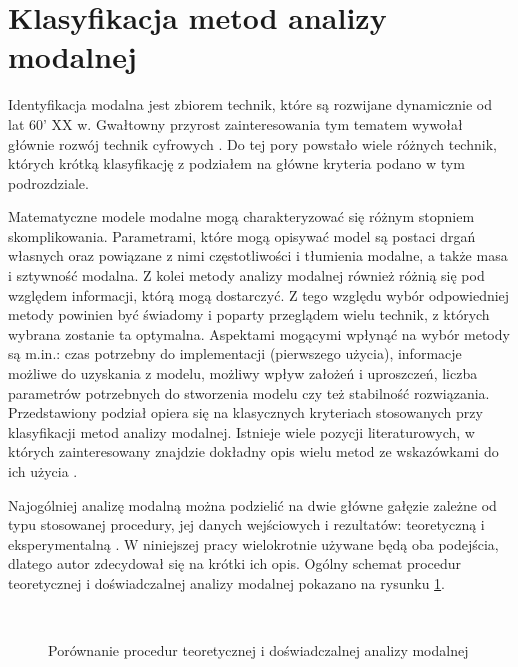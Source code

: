 \section{Klasyfikacja metod analizy modalnej}

Identyfikacja modalna jest zbiorem technik, które są rozwijane dynamicznie od lat 60' XX w. Gwałtowny przyrost zainteresowania tym tematem wywołał głównie rozwój technik cyfrowych \parencite{Ewins2000}. Do tej pory powstało wiele różnych technik, których krótką klasyfikację z podziałem na główne kryteria podano w tym podrozdziale.

Matematyczne modele modalne mogą charakteryzować się różnym stopniem skomplikowania. Parametrami, które mogą opisywać model są postaci drgań własnych oraz powiązane z nimi częstotliwości i tłumienia modalne, a także masa i sztywność modalna. Z kolei metody analizy modalnej również różnią się pod względem informacji, którą mogą dostarczyć. Z tego względu wybór odpowiedniej metody powinien być świadomy i poparty przeglądem wielu technik, z których wybrana zostanie ta optymalna. Aspektami mogącymi wpłynąć na wybór metody są m.in.: czas potrzebny do implementacji (pierwszego użycia), informacje możliwe do uzyskania z modelu, możliwy wpływ założeń i uproszczeń, liczba parametrów potrzebnych do stworzenia modelu czy też stabilność rozwiązania. Przedstawiony podział opiera się na klasycznych kryteriach stosowanych przy klasyfikacji metod analizy modalnej. Istnieje wiele pozycji literaturowych, w których zainteresowany znajdzie dokładny opis wielu metod ze wskazówkami do ich użycia \parencite{Ewins2000,Maia1997,Zhang2004,Brincker2015,Rainieri2014}. 

Najogólniej analizę modalną można podzielić na dwie główne gałęzie zależne od typu stosowanej procedury, jej danych wejściowych i rezultatów: teoretyczną i eksperymentalną \parencite{Lengvarsky2013}. W niniejszej pracy wielokrotnie używane będą oba podejścia, dlatego autor zdecydował się na krótki ich opis. Ogólny schemat procedur teoretycznej i doświadczalnej analizy modalnej pokazano na rysunku \ref{fig:theExpProc}.  

\begin{figure}[h]
	\centering
	 \\
	\captionsetup{justification=centering}
	\caption{Porównanie procedur teoretycznej i doświadczalnej analizy modalnej}
	\label{fig:theExpProc}
\end{figure}

